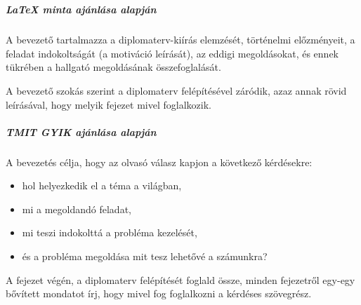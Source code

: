 \chapter{\bevezetes}

\paragraph{LaTeX minta ajánlása alapján}\mbox{}\smallskip

A bevezető tartalmazza a diplomaterv-kiírás elemzését, történelmi előzményeit, a feladat indokoltságát (a motiváció leírását), az eddigi megoldásokat, és ennek tükrében a hallgató megoldásának összefoglalását.

A bevezető szokás szerint a diplomaterv felépítésével záródik, azaz annak rövid leírásával, hogy melyik fejezet mivel foglalkozik.

\paragraph{TMIT GYIK ajánlása alapján}\mbox{}\smallskip

A bevezetés célja, hogy az olvasó válasz kapjon a következő kérdésekre:
\begin{itemize}
    \item hol helyezkedik el a téma a világban,
    \item mi a megoldandó feladat,
    \item mi teszi indokolttá a probléma kezelését,
    \item és a probléma megoldása mit tesz lehetővé a számunkra?
\end{itemize}

A fejezet végén, a diplomaterv felépítését foglald össze, minden fejezetről egy-egy bővített mondatot írj, hogy mivel fog foglalkozni a kérdéses szövegrész.
